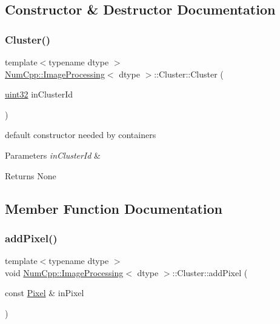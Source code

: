\subsection{Constructor \& Destructor Documentation}
\mbox{\label{class_num_cpp_1_1_image_processing_1_1_cluster_ae630559631a6ae53ee59529a3a42b782}} 
\subsubsection{\texorpdfstring{Cluster()}{Cluster()}}
{\footnotesize\ttfamily template$<$typename dtype $>$ \\
\mbox{\hyperlink{class_num_cpp_1_1_image_processing}{Num\+Cpp\+::\+Image\+Processing}}$<$ dtype $>$\+::Cluster\+::\+Cluster (\begin{DoxyParamCaption}\item[{\mbox{\hyperlink{namespace_num_cpp_a36f388e948380413c63011cab9b7fbd5}{uint32}}}]{in\+Cluster\+Id }\end{DoxyParamCaption})\hspace{0.3cm}{\ttfamily [inline]}}

default constructor needed by containers


\begin{DoxyParams}{Parameters}
{\em in\+Cluster\+Id} & \\
\hline
\end{DoxyParams}
\begin{DoxyReturn}{Returns}
None 
\end{DoxyReturn}


\subsection{Member Function Documentation}
\mbox{\label{class_num_cpp_1_1_image_processing_1_1_cluster_ab8df067c115882959ee28a0c3d8b5bd1}} 
\subsubsection{\texorpdfstring{add\+Pixel()}{addPixel()}}
{\footnotesize\ttfamily template$<$typename dtype $>$ \\
void \mbox{\hyperlink{class_num_cpp_1_1_image_processing}{Num\+Cpp\+::\+Image\+Processing}}$<$ dtype $>$\+::Cluster\+::add\+Pixel (\begin{DoxyParamCaption}\item[{const \mbox{\hyperlink{class_num_cpp_1_1_image_processing_1_1_pixel}{Pixel}} \&}]{in\+Pixel }\end{DoxyParamCaption})\hspace{0.3cm}{\ttfamily [inline]}}

